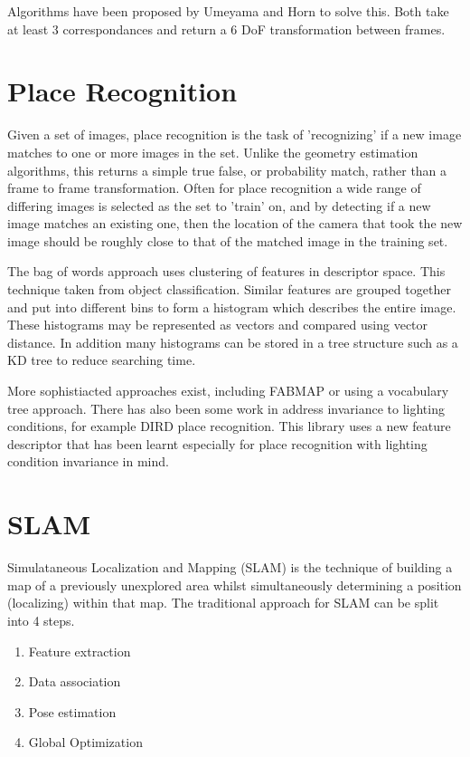 Algorithms have been proposed by Umeyama and Horn to solve this.  Both take at least 3 correspondances and return a 6 DoF transformation between frames.


\section{Place Recognition}
\label{sec:bag_of_words}

Given a set of images, place recognition is the task of 'recognizing' if a new image matches to one or more images in the set.  Unlike the geometry estimation algorithms, this returns a simple true false, or probability match, rather than a frame to frame transformation.  Often for place recognition a wide range of differing images is selected as the set to 'train' on, and by detecting if a new image matches an existing one, then the location of the camera that took the new image should be roughly close to that of the matched image in the training set.

The bag of words approach uses clustering of features in descriptor space.  This technique taken from object classification.  Similar features are grouped together and put into different bins to form a histogram which describes the entire image.  These histograms may be represented as vectors and compared using vector distance.  In addition many histograms can be stored in a tree structure such as a KD tree to reduce searching time.

More sophistiacted approaches exist, including FABMAP or using a vocabulary tree approach.  There has also been some work in address invariance to lighting conditions, for example DIRD place recognition.  This library uses a new feature descriptor that has been learnt especially for place recognition with lighting condition invariance in mind.

\section{SLAM}
\label{sec:slam}

Simulataneous Localization and Mapping (SLAM) is the technique of building a map of a previously
unexplored area whilst simultaneously determining a position (localizing) within that map.  The
traditional approach for SLAM can be split into 4 steps.
\begin{enumerate} \itemsep1pt \parskip0pt 
 \item Feature extraction
 \item Data association
 \item Pose estimation
 \item Global Optimization
\end{enumerate}

